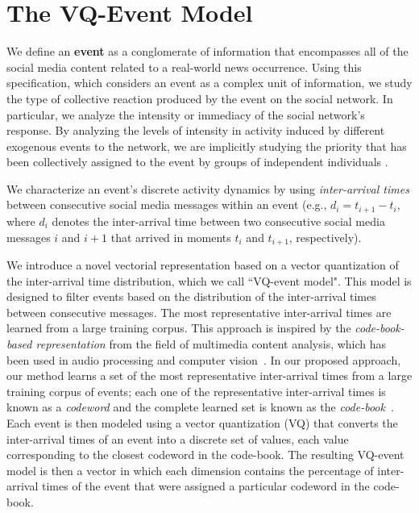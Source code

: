 \section{The VQ-Event Model}
 
We define an {\bf event} as a conglomerate of information that encompasses all
of the social media content related to a real-world news occurrence. 
%
Using this specification, which considers an event as a complex unit of
information, we study the type of collective reaction produced by the event on
the social network. 
%
In particular, we analyze the intensity or immediacy of the
social network's response. 
%
By analyzing the levels of intensity in activity induced by different exogenous
events to the network, we are implicitly studying the priority that has been
collectively assigned to the event by groups of independent individuals
\cite{barabasi2005origin, karsai2012universal}. 

We characterize an event's discrete activity dynamics by using
\emph{inter-arrival times} between consecutive social media messages within an
event (e.g., $d_i = t_{i+1}-t_i$, where $d_i$ denotes the inter-arrival time
between two consecutive social media messages $i$ and $i+1$ that arrived in
moments $t_i$ and $t_{i+1}$, respectively).


We introduce a novel vectorial representation based on a vector quantization of
the inter-arrival time distribution, which we call ``VQ-event model". 
%
This model is designed to filter events based on the distribution of the
inter-arrival times between consecutive messages.  
%
The most representative inter-arrival times are learned from a large training
corpus. 
%
This approach is inspired by the {\em code-book-based representation} from the
field of multimedia content analysis, which has been used in audio processing
and computer vision~\cite{ff,Vaizman}.
%
In our proposed approach, our method learns a set of the most representative
inter-arrival times from a large training corpus of events; 
%
each one of the representative inter-arrival times is known as a {\em codeword}
and the complete learned set is known as the {\em code-book}~\cite{Vaizman}. 
%
Each event is then modeled using a vector quantization (VQ) that converts the
inter-arrival times of an event into a discrete set of values, each value
corresponding to the closest codeword in the code-book. 
%
The resulting VQ-event model is then a vector in which each dimension contains
the percentage of inter-arrival times of the event that were assigned a
particular codeword in the code-book.

